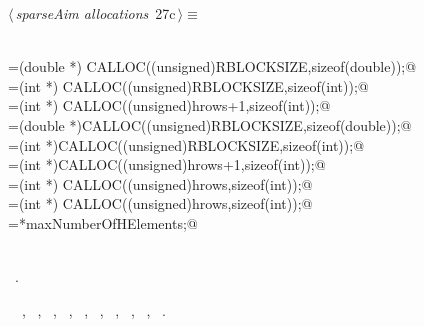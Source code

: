 \documentclass{article}
\begin{document}
\begin{flushleft} \small
\begin{minipage}{\linewidth}\label{scrap29}\raggedright\small
{} $\langle\,${\itshape sparseAim allocations}\nobreak\ {\footnotesize {27c}}$\,\rangle\equiv$
\vspace{-1ex}
\begin{list}{}{} \item
\mbox{}\verb@@\\
\mbox{}\verb@annihilator=(double *) CALLOC((unsigned)RBLOCKSIZE,sizeof(double));@\\
\mbox{}\verb@annihilatorj=(int *) CALLOC((unsigned)RBLOCKSIZE,sizeof(int));@\\
\mbox{}\verb@annihilatori=(int *) CALLOC((unsigned)hrows+1,sizeof(int));@\\
\mbox{}\verb@rmat=(double *)CALLOC((unsigned)RBLOCKSIZE,sizeof(double));@\\
\mbox{}\verb@rmatj=(int *)CALLOC((unsigned)RBLOCKSIZE,sizeof(int));@\\
\mbox{}\verb@rmati=(int *)CALLOC((unsigned)hrows+1,sizeof(int));@\\
\mbox{}\verb@prow=(int *) CALLOC((unsigned)hrows,sizeof(int));@\\
\mbox{}\verb@pcol=(int *) CALLOC((unsigned)hrows,sizeof(int));@\\
\mbox{}\verb@originalMaxHElements=*maxNumberOfHElements;@\\
\mbox{}\verb@@\\
\mbox{}\verb@@{\NWsep}
\end{list}
\vspace{-1.5ex}
\footnotesize
\begin{list}{}{\setlength{\itemsep}{-\parsep}\setlength{\itemindent}{-\leftmargin}}
\item \NWtxtMacroRefIn\ .
\item \NWtxtIdentsUsed\nobreak\  \verb@annihilator@\nobreak\ , \verb@annihilatori@\nobreak\ , \verb@annihilatorj@\nobreak\ , \verb@hrows@\nobreak\ , \verb@maxNumberOfHElements@\nobreak\ , \verb@pcol@\nobreak\ , \verb@prow@\nobreak\ , \verb@rmat@\nobreak\ , \verb@rmati@\nobreak\ , \verb@rmatj@\nobreak\ .
\item{}
\end{list}
\end{minipage}\vspace{4ex}
\end{flushleft}
\end{document}

